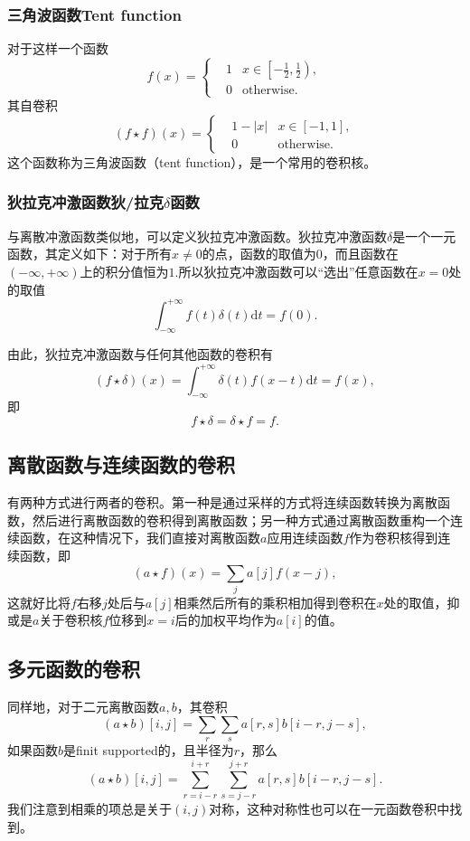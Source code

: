 \documentclass{ctexart}
\begin{document}
	\subsubsection{三角波函数Tent function}
	对于这样一个函数
	$$
	f(x)=\left\{
		\begin{aligned}
			&1&x\in\left[-\frac12,\frac12\right),\\
			&0&\text{otherwise}.
		\end{aligned}
	\right.
	$$
	其自卷积
	$$
	(f\star f)(x)=\left\{
		\begin{aligned}
			&1-|x|&x\in[-1,1],\\
			&0&\text{otherwise}.
		\end{aligned}
	\right.
	$$
	这个函数称为三角波函数（tent function），是一个常用的卷积核。
	
	\subsubsection{狄拉克冲激函数狄/拉克$\delta$函数}
	与离散冲激函数类似地，可以定义狄拉克冲激函数。狄拉克冲激函数$\delta$是一个一元函数，其定义如下：对于所有$x\neq0$的点，函数的取值为$0$，而且函数在$(-\infty,+\infty)$上的积分值恒为$1$.所以狄拉克冲激函数可以“选出”任意函数在$x=0$处的取值
	$$
	\int_{-\infty}^{+\infty}{f(t)\delta(t) \mathrm dt}=f(0).
	$$

	由此，狄拉克冲激函数与任何其他函数的卷积有
	$$
	(f\star \delta)(x)=\int_{-\infty}^{+\infty}{\delta(t)f(x-t)\mathrm dt}=f(x),
	$$
	即
	$$
	f\star \delta=\delta\star f=f.
	$$

	\subsection{离散函数与连续函数的卷积}
	有两种方式进行两者的卷积。第一种是通过采样的方式将连续函数转换为离散函数，然后进行离散函数的卷积得到离散函数；另一种方式通过离散函数重构一个连续函数，在这种情况下，我们直接对离散函数$a$应用连续函数$f$作为卷积核得到连续函数，即
	$$
	(a\star f)(x)=\sum_j{a[j]f(x-j)},
	$$
	这就好比将$f$右移$j$处后与$a[j]$相乘然后所有的乘积相加得到卷积在$x$处的取值，抑或是$a$关于卷积核$f$位移到$x=i$后的加权平均作为$a[i]$的值。

	\subsection{多元函数的卷积}
	同样地，对于二元离散函数$a,b$，其卷积
	$$
	(a\star b)[i,j]=\sum_r\sum_sa[r,s]b[i-r,j-s],
	$$
	如果函数$b$是finit supported的，且半径为$r$，那么
	$$
	(a\star b)[i,j]=\sum_{r=i-r}^{i+r}\sum_{s=j-r}^{j+r}a[r,s]b[i-r,j-s].
	$$
	我们注意到相乘的项总是关于$(i,j)$对称，这种对称性也可以在一元函数卷积中找到。
\end{document}
